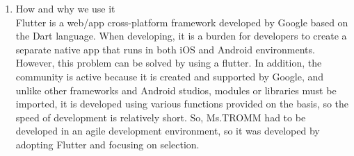 \documentclass[conference]{IEEEtran}
\begin{document}
\begin{enumerate}
    \item How and why we use it \\
    Flutter is a web/app cross-platform framework developed by Google based on the Dart language. When developing, it is a burden for developers to create a separate native app that runs in both iOS and Android environments. However, this problem can be solved by using a flutter. In addition, the community is active because it is created and supported by Google, and unlike other frameworks and Android studios, modules or libraries must be imported, it is developed using various functions provided on the basis, so the speed of development is relatively short. So, Ms.TROMM had to be developed in an agile development environment, so it was developed by adopting Flutter and focusing on selection. \\ \\
\end{enumerate}
\end{document}
